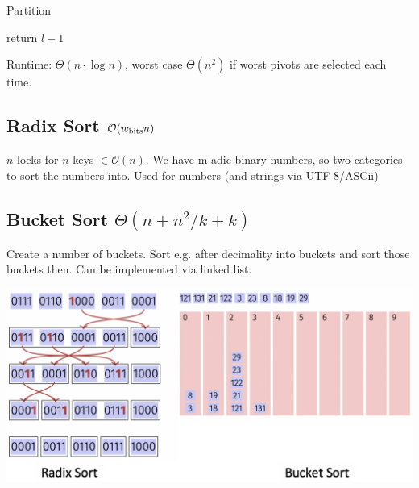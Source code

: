 \documentclass[9pt,landscape,a4paper, table]{extarticle}
\begin{document}
\begin{multicols*}{3}
{\begin{algorithm}[H]
    \SetAlgoLined
\end{algorithm}}

{\scriptsize
\begin{algorithm}[H]
    \caption{Partition}
    
    \SetAlgoLined
    
    return $l-1$
\end{algorithm}}

Runtime: ${\Theta}(n\cdot \log n)$, worst case $\Theta(n^2)$ if worst pivots are selected each time.

\subsection{Radix Sort $\mathcal{O}(w_{\text{\normalfont bits}}n)$}
$n$-locks for $n$-keys $\in \mathcal{O}(n)$. We have m-adic binary numbers, so two categories to sort the numbers into. Used for numbers (and strings via UTF-8/ASCii)
\subsection{Bucket Sort ${\displaystyle \Theta(n+{ {n^{2}}/{k}}+k)}$}
Create a number of buckets. Sort e.g. after decimality into buckets and sort those buckets then. Can be implemented via linked list.


\begin{center}
    \hspace{1cm}\includegraphics[width = 0.6\linewidth]{img/Bucket.png}
\end{center}




\end{multicols*}
\end{document}
